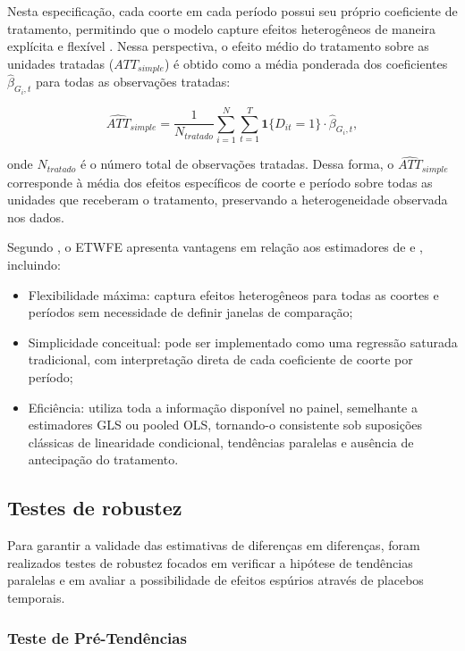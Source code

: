 \documentclass[12pt,a4paper,oneside]{article}
\begin{document}
		Nesta especificação, cada coorte em cada período possui seu próprio coeficiente de tratamento, permitindo que o modelo capture efeitos heterogêneos de maneira explícita e flexível \citep{Wooldridge2025}. Nessa perspectiva, o efeito médio do tratamento sobre as unidades tratadas ($ATT_{simple}$) é obtido como a média ponderada dos coeficientes $\hat{\beta}_{G_i,t}$ para todas as observações tratadas:
		
		\begin{equation}
			\widehat{ATT}_{simple} = \frac{1}{N_{tratado}} \sum_{i=1}^{N} \sum_{t=1}^{T} \mathbf{1}\{D_{it}=1\} \cdot \hat{\beta}_{G_i,t},
		\end{equation}
		
		onde $N_{tratado}$ é o número total de observações tratadas. Dessa forma, o $\widehat{ATT}_{simple}$ corresponde à média dos efeitos específicos de coorte e período sobre todas as unidades que receberam o tratamento, preservando a heterogeneidade observada nos dados.
		
		Segundo \citet{Wooldridge2025}, o ETWFE apresenta vantagens em relação aos estimadores de \citet{Callaway2021} e \citet{Sun2021}, incluindo:
		\begin{itemize}
			\item Flexibilidade máxima: captura efeitos heterogêneos para todas as coortes e períodos sem necessidade de definir janelas de comparação;
			\item Simplicidade conceitual: pode ser implementado como uma regressão saturada tradicional, com interpretação direta de cada coeficiente de coorte por período;
			\item Eficiência: utiliza toda a informação disponível no painel, semelhante a estimadores GLS ou pooled OLS, tornando-o consistente sob suposições clássicas de linearidade condicional, tendências paralelas e ausência de antecipação do tratamento.
		\end{itemize}
		
		
		\subsection{Testes de robustez}
		
		
		Para garantir a validade das estimativas de diferenças em diferenças, foram realizados testes de robustez focados em verificar a hipótese de tendências paralelas e em avaliar a possibilidade de efeitos espúrios através de placebos temporais.
		
		\subsubsection{Teste de Pré-Tendências}
		
\end{document}

